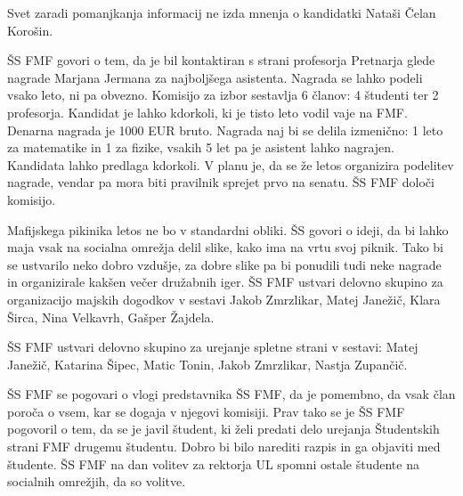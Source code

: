 \documentclass{seja}
\begin{document}
\begin{ad}
\begin{sklep*}
        Svet zaradi pomanjkanja informacij ne izda mnenja o kandidatki Nataši Čelan Korošin.
    \end{sklep*}
   
    \item
    ŠS FMF govori o tem, da je bil kontaktiran s strani profesorja Pretnarja glede nagrade Marjana Jermana za najboljšega asistenta. Nagrada se lahko podeli vsako leto, ni pa obvezno. Komisijo za izbor sestavlja 6 članov: 4 študenti ter 2 profesorja. Kandidat je lahko kdorkoli, ki je tisto leto vodil vaje na FMF. Denarna nagrada je 1000 EUR bruto. Nagrada naj bi se delila izmenično: 1 leto za matematike in 1 za fizike, vsakih 5 let pa je asistent lahko nagrajen. Kandidata lahko predlaga kdorkoli. V planu je, da se že letos organizira podelitev nagrade, vendar pa mora biti pravilnik sprejet prvo na senatu. ŠS FMF določi komisijo. 
    
    \item
    Mafijskega pikinika letos ne bo v standardni obliki. ŠS govori o ideji, da bi lahko maja vsak na socialna omrežja delil slike, kako ima na vrtu svoj piknik. Tako bi se ustvarilo neko dobro vzdušje, za dobre slike pa bi ponudili tudi neke nagrade in organizirale kakšen večer družabnih iger. 
    ŠS FMF ustvari delovno skupino za organizacijo majskih dogodkov v sestavi Jakob Zmrzlikar, Matej Janežič, Klara Širca, Nina Velkavrh, Gašper Žajdela.
    
   
    
    \item
    ŠS FMF ustvari delovno skupino za urejanje spletne strani v sestavi: Matej Janežič, Katarina Šipec, Matic Tonin, Jakob Zmrzlikar, Nastja Zupančič.
    \item
    ŠS FMF se pogovari o vlogi predstavnika ŠS FMF, da je pomembno, da vsak član poroča o vsem, kar se dogaja v njegovi komisiji. 
    Prav tako se je ŠS FMF pogovoril o tem, da se je javil študent, ki želi predati delo urejanja Študentskih strani FMF drugemu študentu. Dobro bi bilo narediti razpis in ga objaviti med študente.
    ŠS FMF na dan volitev za rektorja UL spomni ostale študente na socialnih omrežjih, da so volitve.
    
    
    
    
    
    
    
    
    
    
    
    
    
    
    
    
    
    
    
    
    
\end{ad}
\end{document}
